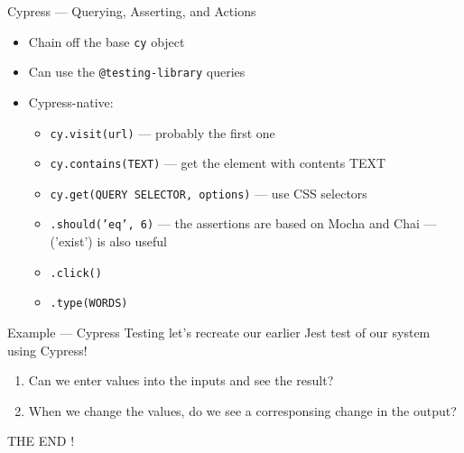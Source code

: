 \documentclass[t]{beamer}
\begin{document}
	\begin{frame}[fragile]{Cypress --- Querying, Asserting, and Actions}
		\begin{itemize}
			\item Chain off the base \texttt{cy} object
			\item Can use the \texttt{@testing-library} queries
			\item Cypress-native:
				\begin{itemize}
					\item \texttt{cy.visit(url)} --- probably the first one
					\item \texttt{cy.contains(TEXT)} --- get the element with contents TEXT
					\item \texttt{cy.get(QUERY SELECTOR, options)} --- use CSS selectors
					\item \texttt{.should('eq', 6)} --- the assertions are based on Mocha and Chai --- ('exist') is also useful
					\item \texttt{.click()}
					\item \texttt{.type(WORDS)}
				\end{itemize}
		\end{itemize}
	\end{frame}

	\begin{frame}{Example --- Cypress Testing}
		let's recreate our earlier Jest test of our system using Cypress!

		\begin{enumerate}
			\item Can we enter values into the inputs and see the result?
			\item When we change the values, do we see a corresponsing change in the output?
		\end{enumerate}

		\framebreak

		
		
	\end{frame}

	\begin{frame}{THE END}
	!	
	\end{frame}
\end{document}

